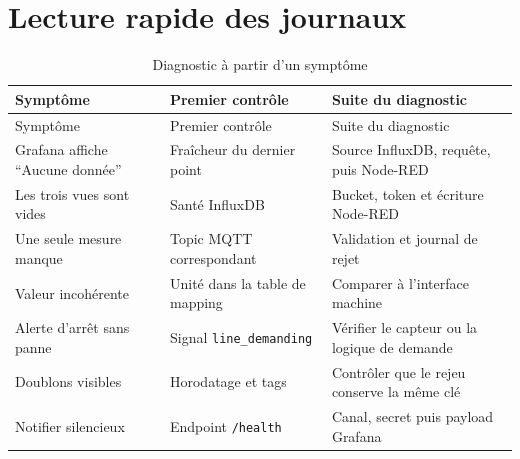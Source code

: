 \section{Lecture rapide des journaux}

\begin{longtable}{p{}p{}p{}}
\caption{Diagnostic à partir d'un symptôme}\\
\toprule
Symptôme & Premier contrôle & Suite du diagnostic \\
\midrule
\endfirsthead
\toprule
Symptôme & Premier contrôle & Suite du diagnostic \\
\midrule
\endhead
Grafana affiche ``Aucune donnée'' & Fraîcheur du dernier point &
Source InfluxDB, requête, puis Node-RED \\
Les trois vues sont vides & Santé InfluxDB &
Bucket, token et écriture Node-RED \\
Une seule mesure manque & Topic MQTT correspondant &
Validation et journal de rejet \\
Valeur incohérente & Unité dans la table de mapping &
Comparer à l'interface machine \\
Alerte d'arrêt sans panne & Signal \texttt{line\_demanding} &
Vérifier le capteur ou la logique de demande \\
Doublons visibles & Horodatage et tags &
Contrôler que le rejeu conserve la même clé \\
Notifier silencieux & Endpoint \texttt{/health} &
Canal, secret puis payload Grafana \\
\bottomrule
\end{longtable}
